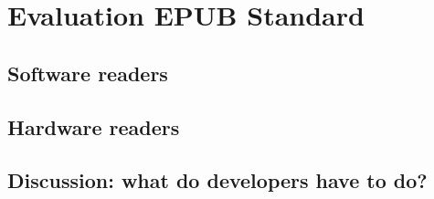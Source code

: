 \chapter{Evaluation EPUB Standard}
\label{ch:Evaluation EPUB Standard}

\section{Software readers}

\section{Hardware readers}

\section{Discussion: what do developers have to do?}
